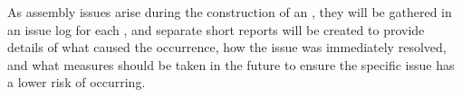 As assembly issues arise during the construction of an , they will be gathered in an issue log for each , and separate short reports will be created to provide details of what caused the occurrence, how the issue was immediately resolved, and what measures should be taken in the future to ensure the specific issue has a lower risk of occurring.  





